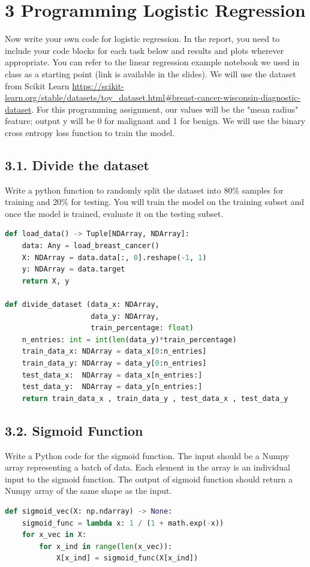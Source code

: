 \documentclass[11pt]{article}
\theoremstyle{plain}
\begin{document}
\section*{3 Programming Logistic Regression   }
Now write your own code for logistic regression. In the report, you need to include your code blocks for each task below and results and plots wherever appropriate.  You can refer to the linear regression example notebook we used in class as a starting point (link is available in the slides).  We will use the dataset from Scikit Learn \url{https://scikit-learn.org/stable/datasets/toy_dataset.html#breast-cancer-wisconsin-diagnostic-dataset}.  For this programming assignment, our values will be the "mean radius" feature;  output y will be 0 for malignant and 1 for benign.  We will use the binary cross entropy loss function to train the model.

\subsection*{3.1. Divide the dataset }
Write a python function to randomly split the dataset into 80\% samples for training and 20\% for testing.  You will train the model on the training subset and once the model is trained, evaluate it on the testing subset.
\begin{lstlisting}[language=Python]
def load_data() -> Tuple[NDArray, NDArray]:
    data: Any = load_breast_cancer()
    X: NDArray = data.data[:, 0].reshape(-1, 1)
    y: NDArray = data.target
    return X, y
    
def divide_dataset (data_x: NDArray,
                    data_y: NDArray, 
                    train_percentage: float)
    n_entries: int = int(len(data_y)*train_percentage)
    train_data_x: NDArray = data_x[0:n_entries]  
    train_data_y: NDArray = data_y[0:n_entries]  
    test_data_x:  NDArray = data_x[n_entries:]   
    test_data_y:  NDArray = data_y[n_entries:]  
    return train_data_x , train_data_y , test_data_x , test_data_y
\end{lstlisting}

\subsection*{3.2. Sigmoid Function }
Write a Python code for the sigmoid function.  The input should be a Numpy array representing a batch of data.  Each element in the array is an individual input to the sigmoid function.  The output of sigmoid function should return a Numpy array of the same shape as the input.
\begin{lstlisting}[language=Python]
def sigmoid_vec(X: np.ndarray) -> None:
    sigmoid_func = lambda x: 1 / (1 + math.exp(-x))
    for x_vec in X:
        for x_ind in range(len(x_vec)):
            X[x_ind] = sigmoid_func(X[x_ind])
\end{lstlisting}
\end{document}
